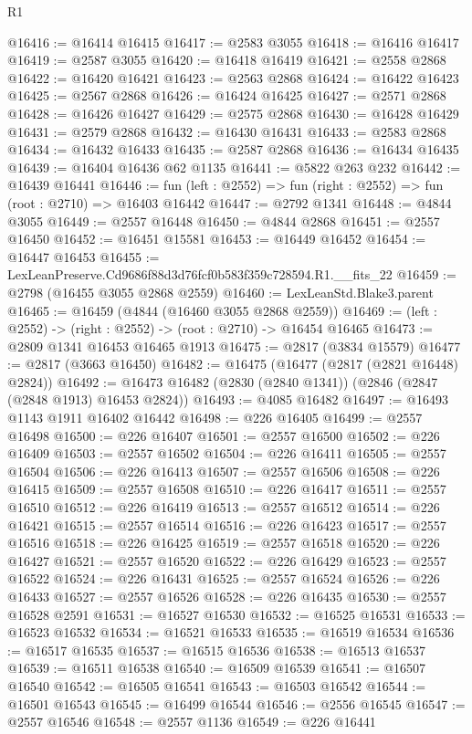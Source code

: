 \begin{lexlean}{R1}
\begin{coremodule}
@16416 := @16414 @16415
@16417 := @2583 @3055
@16418 := @16416 @16417
@16419 := @2587 @3055
@16420 := @16418 @16419
@16421 := @2558 @2868
@16422 := @16420 @16421
@16423 := @2563 @2868
@16424 := @16422 @16423
@16425 := @2567 @2868
@16426 := @16424 @16425
@16427 := @2571 @2868
@16428 := @16426 @16427
@16429 := @2575 @2868
@16430 := @16428 @16429
@16431 := @2579 @2868
@16432 := @16430 @16431
@16433 := @2583 @2868
@16434 := @16432 @16433
@16435 := @2587 @2868
@16436 := @16434 @16435
@16439 := @16404 @16436 @62 @1135
@16441 := @5822 @263 @232
@16442 := @16439 @16441
@16446 := fun (left : @2552) => fun (right : @2552) => fun (root : @2710) => @16403 @16442
@16447 := @2792 @1341
@16448 := @4844 @3055
@16449 := @2557 @16448
@16450 := @4844 @2868
@16451 := @2557 @16450
@16452 := @16451 @15581
@16453 := @16449 @16452
@16454 := @16447 @16453
@16455 := LexLeanPreserve.Cd9686f88d3d76fcf0b583f359c728594.R1.__fits_22
@16459 := @2798 (@16455 @3055 @2868 @2559)
@16460 := LexLeanStd.Blake3.parent
@16465 := @16459 (@4844 (@16460 @3055 @2868 @2559))
@16469 := (left : @2552) -> (right : @2552) -> (root : @2710) -> @16454 @16465
@16473 := @2809 @1341 @16453 @16465 @1913
@16475 := @2817 (@3834 @15579)
@16477 := @2817 (@3663 @16450)
@16482 := @16475 (@16477 (@2817 (@2821 @16448) @2824))
@16492 := @16473 @16482 (@2830 (@2840 @1341)) (@2846 (@2847 (@2848 @1913) @16453 @2824))
@16493 := @4085 @16482
@16497 := @16493 @1143 @1911 @16402 @16442
@16498 := @226 @16405
@16499 := @2557 @16498
@16500 := @226 @16407
@16501 := @2557 @16500
@16502 := @226 @16409
@16503 := @2557 @16502
@16504 := @226 @16411
@16505 := @2557 @16504
@16506 := @226 @16413
@16507 := @2557 @16506
@16508 := @226 @16415
@16509 := @2557 @16508
@16510 := @226 @16417
@16511 := @2557 @16510
@16512 := @226 @16419
@16513 := @2557 @16512
@16514 := @226 @16421
@16515 := @2557 @16514
@16516 := @226 @16423
@16517 := @2557 @16516
@16518 := @226 @16425
@16519 := @2557 @16518
@16520 := @226 @16427
@16521 := @2557 @16520
@16522 := @226 @16429
@16523 := @2557 @16522
@16524 := @226 @16431
@16525 := @2557 @16524
@16526 := @226 @16433
@16527 := @2557 @16526
@16528 := @226 @16435
@16530 := @2557 @16528 @2591
@16531 := @16527 @16530
@16532 := @16525 @16531
@16533 := @16523 @16532
@16534 := @16521 @16533
@16535 := @16519 @16534
@16536 := @16517 @16535
@16537 := @16515 @16536
@16538 := @16513 @16537
@16539 := @16511 @16538
@16540 := @16509 @16539
@16541 := @16507 @16540
@16542 := @16505 @16541
@16543 := @16503 @16542
@16544 := @16501 @16543
@16545 := @16499 @16544
@16546 := @2556 @16545
@16547 := @2557 @16546
@16548 := @2557 @1136
@16549 := @226 @16441

\end{coremodule}
\end{lexlean}
